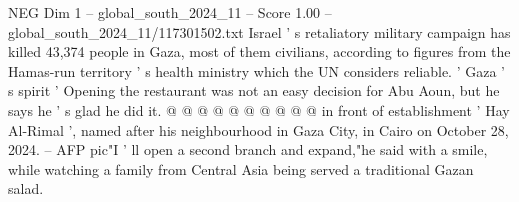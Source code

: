 \begin{textsample}{NEG Dim 1 – global\_south\_2024\_11 – Score 1.00 – global\_south\_2024\_11/117301502.txt}
Israel ' s retaliatory military campaign has killed 43,374 people in Gaza, most of them civilians, according to figures from the Hamas-run territory ' s health ministry which the UN considers reliable. ' Gaza ' s spirit ' Opening the restaurant was not an easy decision for Abu Aoun, but he says he ' s glad he did it. @ @ @ @ @ @ @ @ @ @ in front of establishment ' Hay Al-Rimal ', named after his neighbourhood in Gaza City, in Cairo on October 28, 2024. -- AFP pic"I ' ll open a second branch and expand,"he said with a smile, while watching a family from Central Asia being served a traditional Gazan salad.

\end{textsample}
